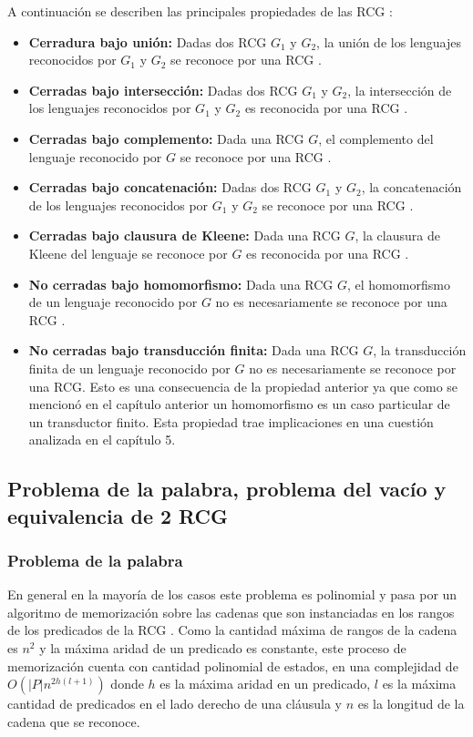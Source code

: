 A continuación se describen las principales propiedades de las RCG \cite{propertiesRCGBib}:
\begin{itemize}
      \item \textbf{Cerradura bajo unión:} Dadas dos RCG $G_1$ y $G_2$, la unión de los lenguajes reconocidos por $G_1$ y $G_2$ se reconoce por una RCG \cite{mainRCGBib}.
      \item \textbf{Cerradas bajo intersección:} Dadas dos RCG $G_1$ y $G_2$, la intersección de los lenguajes reconocidos por $G_1$ y $G_2$ es reconocida por una RCG \cite{mainRCGBib}.
      \item \textbf{Cerradas bajo complemento:} Dada una RCG $G$, el complemento del lenguaje reconocido por $G$ se reconoce por una RCG \cite{mainRCGBib}.
      \item \textbf{Cerradas bajo concatenación:} Dadas dos RCG $G_1$ y $G_2$, la concatenación de los lenguajes reconocidos por $G_1$ y $G_2$ se reconoce por una RCG \cite{mainRCGBib}.
      \item \textbf{Cerradas bajo clausura de Kleene:} Dada una RCG $G$, la clausura de Kleene del lenguaje se reconoce por $G$ es reconocida por una RCG \cite{mainRCGBib}.
      \item  \textbf{No cerradas bajo homomorfismo:} Dada una RCG $G$, el homomorfismo de un lenguaje reconocido por $G$ no es necesariamente se reconoce por una RCG \cite{propertiesRCGBib}.
      \item  \textbf{No cerradas bajo transducción finita:} Dada una RCG $G$, la transducción finita de un lenguaje reconocido por $G$ no es necesariamente se reconoce por una RCG.
            Esto es una consecuencia de la propiedad anterior ya que como se mencionó en el capítulo anterior un homomorfismo es un caso particular de un transductor finito.
            Esta propiedad trae implicaciones en una cuestión analizada en el capítulo 5.
\end{itemize}


\subsection{Problema de la palabra, problema del vacío y equivalencia de 2 RCG}

\subsubsection{Problema de la palabra}

En general en la mayoría de los casos este problema es polinomial y pasa
por un algoritmo de memorización sobre las cadenas que son instanciadas en los rangos de los predicados de la
RCG \cite{mainRCGBib}.  Como la cantidad máxima de rangos de la cadena es $n^2$ y la máxima aridad de un
predicado es constante, este proceso de memorización cuenta con cantidad polinomial de
estados, en una complejidad de $O(|P|n^{2h(l+1)})$ donde $h$ es la máxima aridad en un predicado, $l$
es la máxima cantidad de predicados en el lado derecho de una cláusula y $n$ es la longitud de la cadena
que se reconoce.

